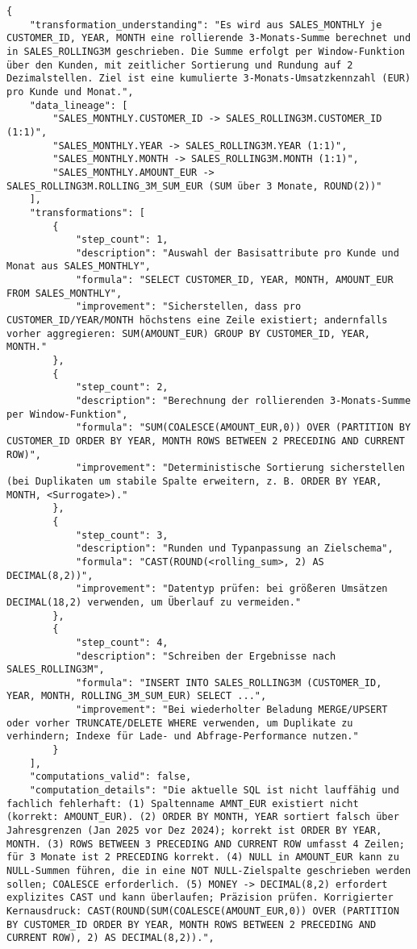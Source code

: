 \begin{lstlisting}[caption={Ausgabe: GPT-5 Anwendungsfall 8 Konsistenzdurchlauf},label={gpt_case8_prompt2}]
{
    "transformation_understanding": "Es wird aus SALES_MONTHLY je CUSTOMER_ID, YEAR, MONTH eine rollierende 3-Monats-Summe berechnet und in SALES_ROLLING3M geschrieben. Die Summe erfolgt per Window-Funktion über den Kunden, mit zeitlicher Sortierung und Rundung auf 2 Dezimalstellen. Ziel ist eine kumulierte 3-Monats-Umsatzkennzahl (EUR) pro Kunde und Monat.",
    "data_lineage": [
        "SALES_MONTHLY.CUSTOMER_ID -> SALES_ROLLING3M.CUSTOMER_ID (1:1)",
        "SALES_MONTHLY.YEAR -> SALES_ROLLING3M.YEAR (1:1)",
        "SALES_MONTHLY.MONTH -> SALES_ROLLING3M.MONTH (1:1)",
        "SALES_MONTHLY.AMOUNT_EUR -> SALES_ROLLING3M.ROLLING_3M_SUM_EUR (SUM über 3 Monate, ROUND(2))"
    ],
    "transformations": [
        {
            "step_count": 1,
            "description": "Auswahl der Basisattribute pro Kunde und Monat aus SALES_MONTHLY",
            "formula": "SELECT CUSTOMER_ID, YEAR, MONTH, AMOUNT_EUR FROM SALES_MONTHLY",
            "improvement": "Sicherstellen, dass pro CUSTOMER_ID/YEAR/MONTH höchstens eine Zeile existiert; andernfalls vorher aggregieren: SUM(AMOUNT_EUR) GROUP BY CUSTOMER_ID, YEAR, MONTH."
        },
        {
            "step_count": 2,
            "description": "Berechnung der rollierenden 3-Monats-Summe per Window-Funktion",
            "formula": "SUM(COALESCE(AMOUNT_EUR,0)) OVER (PARTITION BY CUSTOMER_ID ORDER BY YEAR, MONTH ROWS BETWEEN 2 PRECEDING AND CURRENT ROW)",
            "improvement": "Deterministische Sortierung sicherstellen (bei Duplikaten um stabile Spalte erweitern, z. B. ORDER BY YEAR, MONTH, <Surrogate>)."
        },
        {
            "step_count": 3,
            "description": "Runden und Typanpassung an Zielschema",
            "formula": "CAST(ROUND(<rolling_sum>, 2) AS DECIMAL(8,2))",
            "improvement": "Datentyp prüfen: bei größeren Umsätzen DECIMAL(18,2) verwenden, um Überlauf zu vermeiden."
        },
        {
            "step_count": 4,
            "description": "Schreiben der Ergebnisse nach SALES_ROLLING3M",
            "formula": "INSERT INTO SALES_ROLLING3M (CUSTOMER_ID, YEAR, MONTH, ROLLING_3M_SUM_EUR) SELECT ...",
            "improvement": "Bei wiederholter Beladung MERGE/UPSERT oder vorher TRUNCATE/DELETE WHERE verwenden, um Duplikate zu verhindern; Indexe für Lade- und Abfrage-Performance nutzen."
        }
    ],
    "computations_valid": false,
    "computation_details": "Die aktuelle SQL ist nicht lauffähig und fachlich fehlerhaft: (1) Spaltenname AMNT_EUR existiert nicht (korrekt: AMOUNT_EUR). (2) ORDER BY MONTH, YEAR sortiert falsch über Jahresgrenzen (Jan 2025 vor Dez 2024); korrekt ist ORDER BY YEAR, MONTH. (3) ROWS BETWEEN 3 PRECEDING AND CURRENT ROW umfasst 4 Zeilen; für 3 Monate ist 2 PRECEDING korrekt. (4) NULL in AMOUNT_EUR kann zu NULL-Summen führen, die in eine NOT NULL-Zielspalte geschrieben werden sollen; COALESCE erforderlich. (5) MONEY -> DECIMAL(8,2) erfordert explizites CAST und kann überlaufen; Präzision prüfen. Korrigierter Kernausdruck: CAST(ROUND(SUM(COALESCE(AMOUNT_EUR,0)) OVER (PARTITION BY CUSTOMER_ID ORDER BY YEAR, MONTH ROWS BETWEEN 2 PRECEDING AND CURRENT ROW), 2) AS DECIMAL(8,2)).",

\end{lstlisting}
